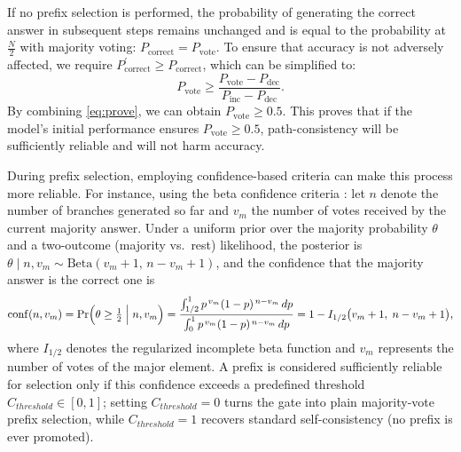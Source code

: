 If no prefix selection is performed, the probability of generating the correct answer in subsequent steps remains unchanged and is equal to the probability at $\frac{N}{2}$ with majority voting: $P_\text{{correct}} =P_{\text{vote}}$.
To ensure that accuracy is not adversely affected, we require $P_\text{{correct}}^{\prime}\geq P_{\text{correct}}$, which can be simplified to:
\begin{equation}
    P_{\text{vote}}\geq \frac{P_{\text{vote}}-P_{\text{dec}}}{P_{\text{inc}}-P_{\text{dec}}}.
\end{equation}
By combining \cref{eq:prove}, we can obtain $P_{\text{vote}}\geq 0.5$. This proves that if the model's initial performance ensures $P_{\text{vote}}\geq 0.5$, path-consistency will be sufficiently reliable and will not harm accuracy.

During prefix selection, employing confidence-based criteria can make this process more reliable. For instance, using the beta confidence criteria \cite{aggarwal2023let}: let $n$ denote the number of branches generated so far and $v_m$ the number of votes received by the current majority answer. Under a uniform prior over the majority probability $\theta$ and a two-outcome (majority vs.\ rest) likelihood, the posterior is $\theta\mid n,v_m \sim \mathrm{Beta}(v_m+1,\, n-v_m+1)$, and the confidence that the majority answer is the correct one is
\begin{equation}\label{eq:confidence}
    \mathrm{conf}(n, v_m)
    = \Pr\!\Big(\theta \ge \tfrac{1}{2}\Bigm| n, v_m\Big)
    = \frac{\int_{1/2}^{1} p^{\,v_m}(1-p)^{\,n-v_m}\,dp}
           {\int_{0}^{1} p^{\,v_m}(1-p)^{\,n-v_m}\,dp}
    = 1 - I_{1/2}\big(v_m+1,\; n-v_m+1\big),
\end{equation}
where $I_{1/2}$ denotes the regularized incomplete beta function and $v_m$ represents the number of votes of the major element. A prefix is considered sufficiently reliable for selection only if this confidence exceeds a predefined threshold $C_{threshold}\in[0,1]$; setting $C_{threshold}=0$ turns the gate into plain majority-vote prefix selection, while $C_{threshold}=1$ recovers standard self-consistency (no prefix is ever promoted).

